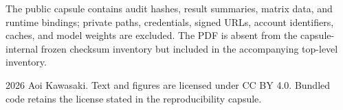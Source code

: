 \documentclass[10pt,a4paper]{article}
\begin{document}
The public capsule contains audit hashes, result summaries, matrix data, and runtime bindings; private paths, credentials, signed URLs, account identifiers, caches, and model weights are excluded. The PDF is absent from the capsule-internal frozen checksum inventory but included in the accompanying top-level inventory.

\begin{center}
\footnotesize \textcopyright{} 2026 Aoi Kawasaki. Text and figures are licensed under CC BY 4.0. Bundled code retains the license stated in the reproducibility capsule.
\end{center}
\end{document}

